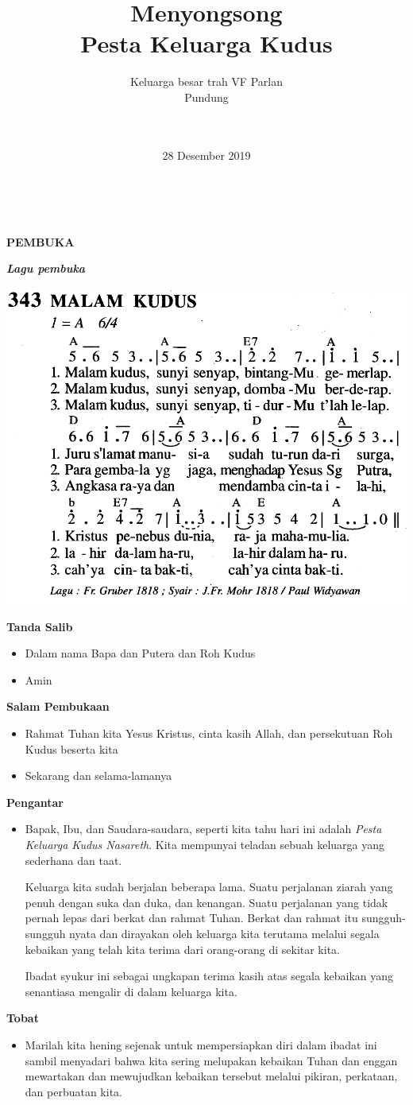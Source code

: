 \documentclass[a5paper,12pt,openany]{scrbook}
\title{Menyongsong\\ Pesta Keluarga Kudus}
\date{28 Desember 2019}
\author{Keluarga besar trah VF Parlan\\Pundung\\~~\\~~\\}
\makeatletter
\newcommand{\judul}[1]{%
  {\parindent \z@ \centering \normalfont
    \interlinepenalty\@M \Large \bfseries #1\par\nobreak \vskip 20\p@ }}
\newcommand{\subjudul}[1]{%
  {\parindent \z@ \normalfont
    \interlinepenalty\@M \bfseries #1\par\nobreak \vskip 20\p@ }}
\newcommand{\lagu}[1]{%
  {\parindent \z@ \normalfont
    \interlinepenalty\@M \bfseries \emph{#1}\par\nobreak \vskip 20\p@ }}
\newcommand{\BU}[1]{\begin{itemize} \item[U:] #1 \end{itemize}}
\newcommand{\BI}[1]{\begin{itemize} \item[P:] #1 \end{itemize}}
\makeatother
\begin{document}
\maketitle
\thispagestyle{empty}
~
\newpage
\judul{PEMBUKA}

\lagu{Lagu pembuka}
\includegraphics[scale=0.3]{mb343-malam-kudus.png}

\subjudul{Tanda Salib}
\BI{Dalam nama Bapa dan Putera dan Roh Kudus}
\BU{Amin}

\subjudul{Salam Pembukaan}
\BI{Rahmat Tuhan kita Yesus Kristus, cinta kasih Allah, dan persekutuan Roh Kudus beserta kita}
\BU{Sekarang dan selama-lamanya}

\subjudul{Pengantar}
\BI{Bapak, Ibu, dan Saudara-saudara, seperti kita tahu hari ini adalah \textit{Pesta Keluarga Kudus Nasareth}. Kita mempunyai teladan sebuah keluarga yang sederhana dan taat.

Keluarga kita sudah berjalan beberapa lama. Suatu perjalanan ziarah yang penuh dengan suka dan duka, dan kenangan. Suatu perjalanan yang tidak pernah lepas dari berkat dan rahmat Tuhan. Berkat dan rahmat itu sungguh-sungguh nyata dan dirayakan oleh keluarga kita terutama melalui segala kebaikan yang telah kita terima dari orang-orang di sekitar kita.

Ibadat syukur ini sebagai ungkapan terima kasih atas segala kebaikan yang senantiasa mengalir di dalam keluarga kita.}

\subjudul{Tobat}
\BI{Marilah kita hening sejenak untuk mempersiapkan diri dalam ibadat ini sambil menyadari bahwa kita sering melupakan kebaikan Tuhan dan enggan mewartakan dan mewujudkan kebaikan tersebut melalui pikiran, perkataan, dan perbuatan kita.}
\end{document}
